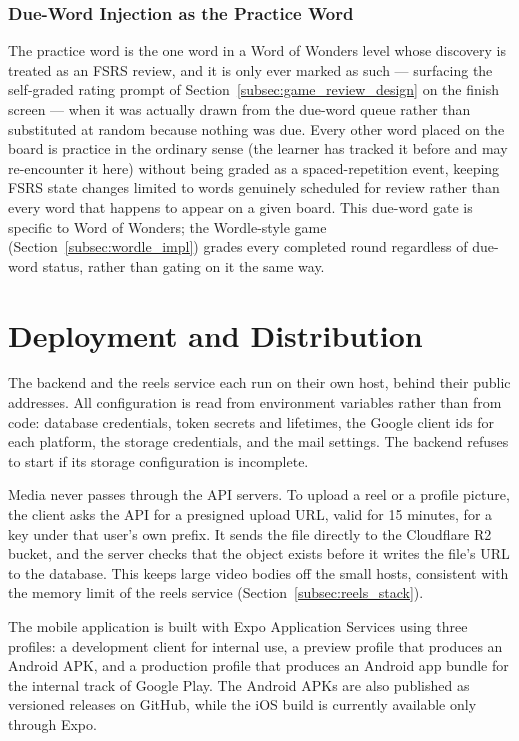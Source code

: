         \subsubsection{Due-Word Injection as the Practice Word}
        The practice word is the one word in a Word of Wonders level whose discovery is treated as an FSRS review, and it is only ever marked as such --- surfacing the self-graded rating prompt of Section~\ref{subsec:game_review_design} on the finish screen --- when it was actually drawn from the due-word queue rather than substituted at random because nothing was due. Every other word placed on the board is practice in the ordinary sense (the learner has tracked it before and may re-encounter it here) without being graded as a spaced-repetition event, keeping FSRS state changes limited to words genuinely scheduled for review rather than every word that happens to appear on a given board. This due-word gate is specific to Word of Wonders; the Wordle-style game (Section~\ref{subsec:wordle_impl}) grades every completed round regardless of due-word status, rather than gating on it the same way.


\section{Deployment and Distribution}
\label{sec:deployment_impl}
    The backend and the reels service each run on their own host, behind their public addresses. All configuration is read from environment variables rather than from code: database credentials, token secrets and lifetimes, the Google client ids for each platform, the storage credentials, and the mail settings. The backend refuses to start if its storage configuration is incomplete.

    Media never passes through the API servers. To upload a reel or a profile picture, the client asks the API for a presigned upload URL, valid for 15 minutes, for a key under that user's own prefix. It sends the file directly to the Cloudflare R2 bucket, and the server checks that the object exists before it writes the file's URL to the database. This keeps large video bodies off the small hosts, consistent with the memory limit of the reels service (Section~\ref{subsec:reels_stack}).

    The mobile application is built with Expo Application Services using three profiles: a development client for internal use, a preview profile that produces an Android APK, and a production profile that produces an Android app bundle for the internal track of Google Play. The Android APKs are also published as versioned releases on GitHub, while the iOS build is currently available only through Expo.

\newpage
